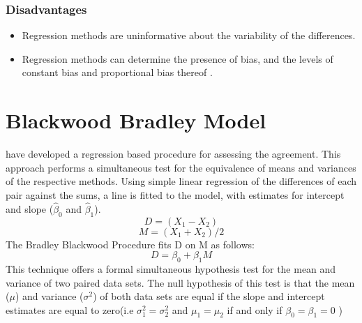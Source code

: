 \documentclass[MAIN.tex]{subfiles}
\begin{document}
\subsubsection{Disadvantages}
\begin{itemize}
	\item Regression methods are uninformative about the variability of the differences.
\end{itemize}

\begin{itemize}\item
	Regression methods can determine the presence of bias, and the levels of constant bias and proportional bias thereof \cite{ludbrook97,ludbrook02}.
\end{itemize}

	\section{Blackwood Bradley Model} 
	
	\citet{BB89} have developed a regression based procedure for
	assessing the agreement. This approach performs a simultaneous test for the equivalence of
	means and variances of the respective methods. Using simple linear
	regression of the differences of each pair against the sums, a
	line is fitted to the model, with estimates for intercept and
	slope ($\hat{\beta}_{0}$ and $\hat{\beta}_{1}$).
	\begin{equation}
	D = (X_{1}-X_{2})
	\end{equation}
	\begin{equation}
	M = (X_{1} + X_{2}) /2
	\end{equation}
	The Bradley Blackwood Procedure fits D on M as follows:\\
	\begin{equation}
	D = \beta_{0} + \beta_{1}M
	\end{equation}
	This technique offers a formal simultaneous hypothesis test for the
	mean and variance of two paired data sets.  The null
	hypothesis of this test is that the mean ($\mu$) and variance
	($\sigma^{2}$) of both data sets are equal if the slope and
	intercept estimates are equal to zero(i.e $\sigma^{2}_{1} =
	\sigma^{2}_{2}$ and $\mu_{1}=\mu_{2}$ if and only if $\beta_{0}=
	\beta_{1}=0$ )
	
\end{document}
